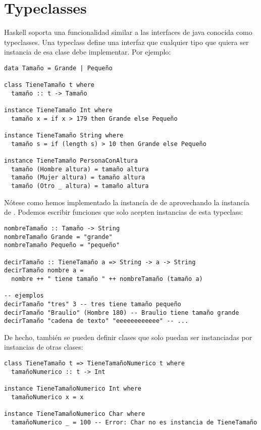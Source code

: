 \section{Typeclasses}
Haskell soporta una funcionalidad similar a las interfaces de java
conocida como typeclasses. Una typeclass define una interfaz que
cualquier tipo que quiera ser instancia de esa clase debe implementar.
Por ejemplo:
\begin{verbatim}
data Tamaño = Grande | Pequeño

class TieneTamaño t where
  tamaño :: t -> Tamaño

instance TieneTamaño Int where
  tamaño x = if x > 179 then Grande else Pequeño

instance TieneTamaño String where
  tamaño s = if (length s) > 10 then Grande else Pequeño

instance TieneTamaño PersonaConAltura
  tamaño (Hombre altura) = tamaño altura
  tamaño (Mujer altura) = tamaño altura
  tamaño (Otro _ altura) = tamaño altura
\end{verbatim}
Nótese como hemos implementado la instancia de  de
 aprovechando la instancia de .
Podemos escribir funciones que solo acepten instancias de
esta typeclass:
\begin{verbatim}
nombreTamaño :: Tamaño -> String
nombreTamaño Grande = "grande"
nombreTamaño Pequeño = "pequeño"

decirTamaño :: TieneTamaño a => String -> a -> String
decirTamaño nombre a =
  nombre ++ " tiene tamaño " ++ nombreTamaño (tamaño a)

-- ejemplos
decirTamaño "tres" 3 -- tres tiene tamaño pequeño
decirTamaño "Braulio" (Hombre 180) -- Braulio tiene tamaño grande
decirTamaño "cadena de texto" "eeeeeeeeeeee" -- ...
\end{verbatim}
De hecho, también se pueden definir clases que solo puedan ser
instanciadas por instancias de otras clases:
\begin{verbatim}
class TieneTamaño t => TieneTamañoNumerico t where
  tamañoNumerico :: t -> Int

instance TieneTamañoNumerico Int where
  tamañoNumerico x = x

instance TieneTamañoNumerico Char where
  tamañoNumerico _ = 100 -- Error: Char no es instancia de TieneTamaño
\end{verbatim}
